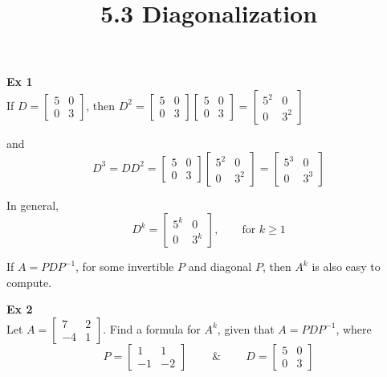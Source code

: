 \documentclass{article}
\title{5.3 Diagonalization}
\begin{document}
    \maketitle
    \textbf{Ex 1}\\
    If $ D=\begin{bmatrix}
        5 &0\\
        0 &3
    \end{bmatrix} $, then
    $ D^{2}=\begin{bmatrix}
        5 &0\\
        0 &3
    \end{bmatrix}
    \begin{bmatrix}
        5 &0\\
        0 &3
    \end{bmatrix}=
    \begin{bmatrix}
        5^{2} &0\\
        0 &3^{2}  
    \end{bmatrix}
    $

    and
    \[
        D^{3}=DD^{2}=
        \begin{bmatrix}
            5 &0\\
            0 &3
        \end{bmatrix}
        \begin{bmatrix}
            5^{2}  &0\\
            0 &3^{2} 
        \end{bmatrix}=
        \begin{bmatrix}
            5^{3} &0\\
            0 &3^{3}  
        \end{bmatrix}
    \]

    In general,
    \[
        D^{k}=
        \begin{bmatrix}
            5^{k} &0\\
            0 &3^{k}  
        \end{bmatrix}, \qquad \text{for }k \ge 1
    \]

    If $ A=PDP^{-1} $, for some invertible $ P $ and diagonal $ P $, then $ A^{k} $ is also easy to compute.

    \textbf{Ex 2}\\
    Let $ A=\begin{bmatrix}
        7 &2\\
        -4 &1
    \end{bmatrix} $. Find a formula for $ A^{k} $, given that $ A=PDP^{-1} $, where
    \[
        P=\begin{bmatrix}
            1 &1\\
            -1 &-2
        \end{bmatrix} \qquad ~\&~ \qquad 
        D=\begin{bmatrix}
            5 &0\\
            0 &3
        \end{bmatrix}
    \]
\end{document}
